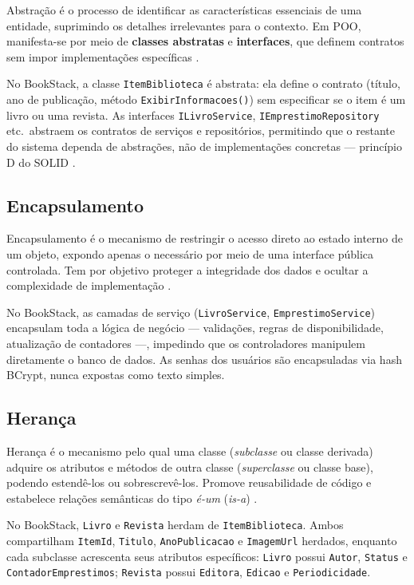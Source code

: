\documentclass[
  12pt,
  a4paper,
  oneside,
  brazil
]{abntex2}
\begin{document}
Abstração é o processo de identificar as características essenciais de uma entidade, suprimindo os detalhes irrelevantes para o contexto. Em POO, manifesta-se por meio de \textbf{classes abstratas} e \textbf{interfaces}, que definem contratos sem impor implementações específicas \cite{pressman2016}.

No BookStack, a classe \texttt{ItemBiblioteca} é abstrata: ela define o contrato (título, ano de publicação, método \texttt{ExibirInformacoes()}) sem especificar se o item é um livro ou uma revista. As interfaces \texttt{ILivroService}, \texttt{IEmprestimoRepository} etc.\ abstraem os contratos de serviços e repositórios, permitindo que o restante do sistema dependa de abstrações, não de implementações concretas — princípio D do SOLID \cite{martin2000}.

\subsection{Encapsulamento}

Encapsulamento é o mecanismo de restringir o acesso direto ao estado interno de um objeto, expondo apenas o necessário por meio de uma interface pública controlada. Tem por objetivo proteger a integridade dos dados e ocultar a complexidade de implementação \cite{booch1994}.

No BookStack, as camadas de serviço (\texttt{LivroService}, \texttt{EmprestimoService}) encapsulam toda a lógica de negócio — validações, regras de disponibilidade, atualização de contadores —, impedindo que os controladores manipulem diretamente o banco de dados. As senhas dos usuários são encapsuladas via hash BCrypt, nunca expostas como texto simples.

\subsection{Herança}

Herança é o mecanismo pelo qual uma classe (\textit{subclasse} ou classe derivada) adquire os atributos e métodos de outra classe (\textit{superclasse} ou classe base), podendo estendê-los ou sobrescrevê-los. Promove reusabilidade de código e estabelece relações semânticas do tipo \textit{é-um} (\textit{is-a}) \cite{gamma1995}.

No BookStack, \texttt{Livro} e \texttt{Revista} herdam de \texttt{ItemBiblioteca}. Ambos compartilham \texttt{ItemId}, \texttt{Titulo}, \texttt{AnoPublicacao} e \texttt{ImagemUrl} herdados, enquanto cada subclasse acrescenta seus atributos específicos: \texttt{Livro} possui \texttt{Autor}, \texttt{Status} e \texttt{ContadorEmprestimos}; \texttt{Revista} possui \texttt{Editora}, \texttt{Edicao} e \texttt{Periodicidade}.
\end{document}
